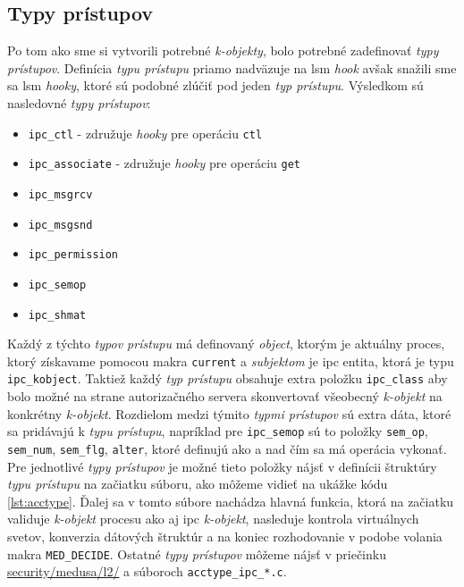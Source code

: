 \subsection{Typy prístupov}
Po tom ako sme si vytvorili potrebné \textit{k-objekty}, bolo potrebné zadefinovať \textit{typy prístupov}. Definícia \textit{typu prístupu} priamo nadväzuje na \acrshort{lsm} \textit{hook} avšak snažili sme sa \acrshort{lsm} \textit{hooky}, ktoré sú podobné zlúčiť pod jeden \textit{typ prístupu}. Výsledkom sú nasledovné \textit{typy prístupov}:
\begin{itemize}
\item \texttt{ipc\_ctl} - združuje \textit{hooky} pre operáciu \texttt{ctl}
\item \texttt{ipc\_associate} - združuje \textit{hooky} pre operáciu \texttt{get}
\item \texttt{ipc\_msgrcv}
\item \texttt{ipc\_msgsnd}
\item \texttt{ipc\_permission}
\item \texttt{ipc\_semop}
\item \texttt{ipc\_shmat}
\end{itemize} 
Každý z týchto \textit{typov prístupu} má definovaný \textit{object}, ktorým je aktuálny proces, ktorý získavame pomocou makra \texttt{current} a \textit{subjektom} je \acrshort{ipc} entita, ktorá je typu \texttt{ipc\_kobject}. Taktiež každý \textit{typ prístupu} obsahuje extra položku \texttt{ipc\_class} aby bolo možné na strane autorizačného servera skonvertovať všeobecný \textit{k-objekt} na konkrétny \textit{k-objekt}. Rozdielom medzi týmito \textit{typmi prístupov} sú extra dáta, ktoré sa pridávajú k \textit{typu prístupu}, napríklad pre \texttt{ipc\_semop} sú to položky \texttt{sem\_op}, \texttt{sem\_num}, \texttt{sem\_flg}, \texttt{alter}, ktoré definujú ako a nad čím sa má operácia vykonať. Pre jednotlivé \textit{typy prístupov} je možné tieto položky nájsť v definícii štruktúry \textit{typu prístupu} na začiatku súboru, ako môžeme vidieť na ukážke kódu \ref{lst:acctype}. Ďalej sa v tomto súbore nachádza hlavná funkcia, ktorá na začiatku validuje \textit{k-objekt} procesu ako aj \acrshort{ipc} \textit{k-objekt}, nasleduje kontrola virtuálnych svetov, konverzia dátových štruktúr a na koniec rozhodovanie v podobe volania makra \texttt{MED\_DECIDE}. Ostatné \textit{typy prístupov} môžeme nájsť v priečinku \url{security/medusa/l2/} a súboroch \texttt{acctype\_ipc\_*.c}. 

